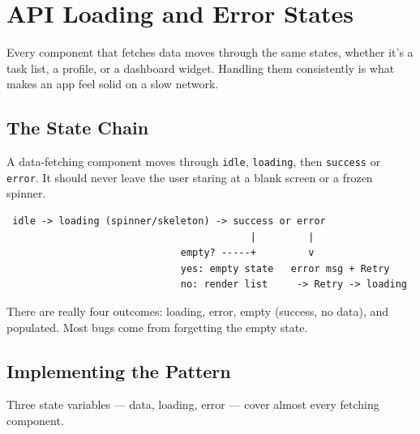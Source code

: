 \chapter{API Loading and Error States}

Every component that fetches data moves through the same states, whether
it's a task list, a profile, or a dashboard widget. Handling them
consistently is what makes an app feel solid on a slow network.

\section{The State Chain}

A data-fetching component moves through \texttt{idle}, \texttt{loading},
then \texttt{success} or \texttt{error}. It should never leave the user
staring at a blank screen or a frozen spinner.

\begin{diagrambox}
\begin{verbatim}
 idle -> loading (spinner/skeleton) -> success or error
                                          |         |
                              empty? -----+         v
                              yes: empty state   error msg + Retry
                              no: render list     -> Retry -> loading
\end{verbatim}
\end{diagrambox}

\begin{notebox}[NOTE]
There are really four outcomes: loading, error, empty (success, no data),
and populated. Most bugs come from forgetting the empty state.
\end{notebox}

\section{Implementing the Pattern}

Three state variables --- data, loading, error --- cover almost every
fetching component.

